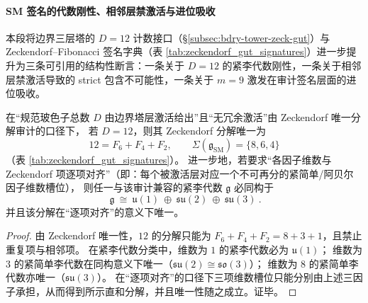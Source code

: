 \paragraph{SM 签名的代数刚性、相邻层禁激活与进位吸收}\label{par:bdry-tower-sm-rigidity-adjacent-carry}
本段将边界三层塔的 \(D=12\) 计数接口（\S\ref{subsec:bdry-tower-zeck-gut}）与 Zeckendorf--Fibonacci 签名字典（表 \ref{tab:zeckendorf_gut_signatures}）进一步提升为三条可引用的结构性断言：一条关于 \(D=12\) 的紧李代数刚性，一条关于相邻层禁激活导致的 strict 包含不可能性，一条关于 \(m=9\) 激发在审计签名层面的进位吸收。

\begin{proposition}\label{prop:sm-zeckendorf-lie-algebra-rigidity}
在“规范玻色子总数 \(D\) 由边界塔层激活给出”且“无冗余激活”由 Zeckendorf 唯一分解审计的口径下，
若 \(D=12\)，则其 Zeckendorf 分解唯一为
\[
12=F_{6}+F_{4}+F_{2},
\qquad
\Sigma(\mathfrak g_{\mathrm{SM}})=\{8,6,4\}
\]
（表 \ref{tab:zeckendorf_gut_signatures}）。
进一步地，若要求“各因子维数与 Zeckendorf 项逐项对齐”（即：每个被激活层对应一个不可再分的紧简单/阿贝尔因子维数槽位），
则任一与该审计兼容的紧李代数 \(\mathfrak g\) 必同构于
\[
\boxed{\ \mathfrak g\ \cong\ \mathfrak u(1)\ \oplus\ \mathfrak{su}(2)\ \oplus\ \mathfrak{su}(3)\ }.
\]
并且该分解在“逐项对齐”的意义下唯一。
\end{proposition}
\begin{proof}
由 Zeckendorf 唯一性，\(12\) 的分解只能为 \(F_6+F_4+F_2=8+3+1\)，且禁止重复项与相邻项。
在紧李代数分类中，维数为 \(1\) 的紧李代数必为 \(\mathfrak u(1)\)；
维数为 \(3\) 的紧简单李代数在同构意义下唯一（\(\mathfrak{su}(2)\cong\mathfrak{so}(3)\)）；
维数为 \(8\) 的紧简单李代数亦唯一（\(\mathfrak{su}(3)\)）。
在“逐项对齐”的口径下三项维数槽位只能分别由上述三因子承担，从而得到所示直和分解，并且唯一性随之成立。证毕。
\end{proof}



